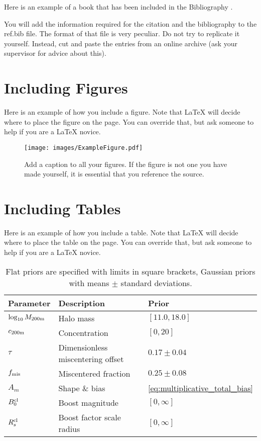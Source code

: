 Here is an example of a book that has been included in the Bibliography \cite{MULLER2017}.

You will add the information required for the citation and the bibliography to the ref.bib file. The format of that file is very peculiar. Do not try to replicate it yourself. Instead, cut and paste the entries from an online archive (ask your supervisor for advice about this).

\section{Including Figures}

Here is an example of how you include a figure. Note that LaTeX will decide where to place the figure on the page. You can override that, but ask someone to help if you are a LaTeX novice.

\begin{figure}
 	\texttt{[image: images/ExampleFigure.pdf]}
	\caption{Add a caption to all your figures. If the figure is not one you have made yourself, it is essential that you reference the source.}
	\label{fig:footprint}
\end{figure}


\section{Including Tables}

Here is an example of how you include a table. Note that LaTeX will decide where to place the table on the page. You can override that, but ask someone to help if you are a LaTeX novice.

\begin{table}
	\setlength{\tabcolsep}{.4em}
	\caption{Flat priors are specified with limits in square brackets, Gaussian priors with means $\pm$ standard deviations.}
	\begin{tabular}{lll}
		Parameter & Description & Prior \\ \hline
		$\log_{10}M_{\rm 200m}$ & Halo mass & $[11.0,18.0]$ \\
        $c_{\rm 200m}$ & Concentration & $[0,20]$\\
        $\tau$ & Dimensionless miscentering offset & $0.17\pm0.04$\\
		$f_{\rm mis}$ & Miscentered fraction & $0.25\pm0.08$\\
		$A_{m}$&Shape \& bias & \autoref{eq:multiplicative_total_bias}\\
		$B_0^{\rm cl}$ & Boost magnitude & $[0,\infty]$\\
		$R_s^{\rm cl}$ & Boost factor scale radius & $[0,\infty]$ \\
	\end{tabular}
    \label{tab:modeling_parameters}
\end{table}

